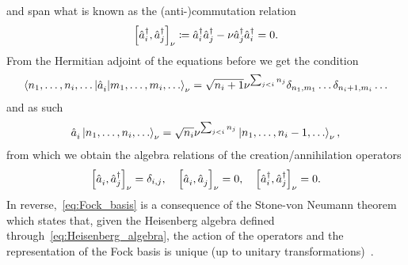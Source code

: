 and span what is known as the (anti-)commutation relation
\begin{align}
    \left[ \hat a^\dag_i, \hat a^\dag_j \right]_\nu \coloneqq \hat a^\dag_i \hat a^\dag_j - \nu \hat a^\dag_j \hat a^\dag_i = 0.
\end{align}
From the Hermitian adjoint of the equations before we get the condition
\begin{align}
   \braket{n_1,\dots,n_i,\dots | \hat a^\pdag_i | m_1, \dots, m_i,\dots}_\nu =
   \sqrt{n_i+1}\nu^{\sum_{j<i}n_j} \delta_{n_1,m_1}\dots\delta_{n_i+1,m_i}\dots
\end{align}
and as such
\begin{align}
   \hat a^\pdag_i \ket{n_1, \dots, n_i,\dots}_\nu =
   \sqrt{n_i}\nu^{\sum_{j<i}n_j} \ket{n_1, \dots, n_i-1,\dots}_\nu,
   \label{eq:annihilation}
\end{align}
from which we obtain the algebra relations of the creation/annihilation operators
\begin{align}
    \commutator{\hat a^\pdag_i,\hat a^\dag_j}_\nu = \delta_{i,j},
    \quad
    \commutator{\hat a^\pdag_i,\hat a^\pdag_j}_\nu = 0,
    \quad
    \commutator{\hat a^\dag_i,\hat a^\dag_j}_\nu = 0.
    \label{eq:Heisenberg_algebra}
\end{align}
In reverse,~\cref{eq:Fock_basis} is a consequence of the Stone-von Neumann theorem which states that, given the Heisenberg algebra defined through~\cref{eq:Heisenberg_algebra}, the action of the operators and the representation of the Fock basis is unique (up to unitary transformations)~\cite{Hall2013}.

